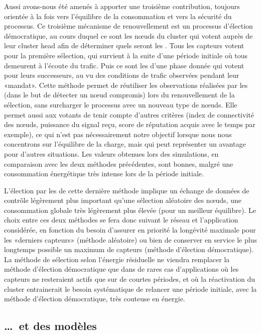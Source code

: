 Aussi avons-nous été amenés à apporter une troisième contribution, toujours orientée à la fois vers l'équilibre de la consommation et vers la sécurité du processus.
Ce troisième mécanisme de renouvellement est un processus d'élection démocratique, au cours duquel ce sont les nœuds du cluster qui votent auprès de leur cluster head afin de déterminer quels seront les \cnst.
Tous les capteurs votent pour la première sélection, qui survient à la suite d'une période initiale où tous demeurent à l'écoute du trafic.
Puis ce sont les \cnst d'une phase donnée qui votent pour leurs successeurs, au vu des conditions de trafic observées pendant leur «mandat».
Cette méthode permet de réutiliser les observations réalisées par les \cnst (dans le but de détecter un nœud compromis) lors du renouvellement de la sélection, sans surcharger le processus avec un nouveau type de nœuds.
Elle permet aussi aux votants de tenir compte d'autres critères (index de connectivité des nœuds, puissance du signal reçu, score de réputation acquis avec le temps par exemple), ce qui n'est pas nécessairement notre objectif lorsque nous nous concentrons sur l'équilibre de la charge, mais qui peut représenter un avantage pour d'autres situations.
Les valeurs obtenues lors des simulations, en comparaison avec les deux méthodes précédentes, sont bonnes, malgré une consommation énergétique très intense lors de la période initiale.

L'élection par les \cnst de cette dernière méthode implique un échange de données de contrôle légèrement plus important qu'une sélection aléatoire des nœuds, \cad une consommation globale très légèrement plus élevée (pour un meilleur équilibre).
Le choix entre ces deux méthodes se fera donc suivant le réseau et l'application considérée, en fonction du besoin d'assurer en priorité la longévité maximale pour les «derniers capteurs» (méthode aléatoire) ou bien de conserver en service le plus longtemps possible un maximum de capteurs (méthode d'élection démocratique).
La méthode de sélection selon l'énergie résiduelle ne viendra remplacer la méthode d'élection démocratique que dans de rares cas d'applications où les capteurs ne resteraient actifs que sur de courtes périodes, et où la réactivation du cluster entrainerait le besoin systématique de relancer une période initiale, avec la méthode d'élection démocratique, très couteuse en énergie.

    \subsection{\dots\ et des modèles}

